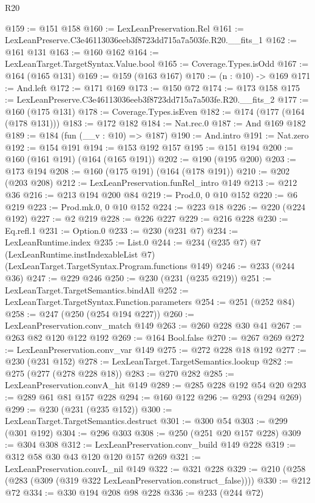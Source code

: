 \begin{lexlean}{R20}
\begin{coremodule}
@159 := @151 @158
@160 := LexLeanPreservation.Rel
@161 := LexLeanPreserve.C3e46113036eeb3f8723dd715a7a503fe.R20.__fits_1
@162 := @161 @131
@163 := @160 @162
@164 := LexLeanTarget.TargetSyntax.Value.bool
@165 := Coverage.Types.isOdd
@167 := @164 (@165 @131)
@169 := @159 (@163 @167)
@170 := (n : @10) -> @169
@171 := And.left
@172 := @171 @169
@173 := @150 @72
@174 := @173 @158
@175 := LexLeanPreserve.C3e46113036eeb3f8723dd715a7a503fe.R20.__fits_2
@177 := @160 (@175 @131)
@178 := Coverage.Types.isEven
@182 := @174 (@177 (@164 (@178 @131)))
@183 := @172 @182
@184 := Nat.rec.{0}
@187 := And @169 @182
@189 := @184 (fun (__v : @10) => @187)
@190 := And.intro
@191 := Nat.zero
@192 := @154 @191
@194 := @153 @192 @157
@195 := @151 @194
@200 := @160 (@161 @191) (@164 (@165 @191))
@202 := @190 (@195 @200)
@203 := @173 @194
@208 := @160 (@175 @191) (@164 (@178 @191))
@210 := @202 (@203 @208)
@212 := LexLeanPreservation.funRel_intro @149
@213 := @212 @36
@216 := @213 @194 @200 @84
@219 := Prod.{0, 0} @10 @152
@220 := @6 @219
@223 := Prod.mk.{0, 0} @10 @152
@224 := @223 @18
@226 := @220 (@224 @192)
@227 := @2 @219
@228 := @226 @227
@229 := @216 @228
@230 := Eq.refl.{1}
@231 := Option.{0}
@233 := @230 (@231 @7)
@234 := LexLeanRuntime.index
@235 := List.{0}
@244 := @234
    (@235 @7)
    @7
    (LexLeanRuntime.instIndexableList @7)
    (LexLeanTarget.TargetSyntax.Program.functions @149)
@246 := @233 (@244 @36)
@247 := @229 @246
@250 := @230 (@231 (@235 @219))
@251 := LexLeanTarget.TargetSemantics.bindAll
@252 := LexLeanTarget.TargetSyntax.Function.parameters
@254 := @251 (@252 @84)
@258 := @247 (@250 (@254 @194 @227))
@260 := LexLeanPreservation.conv_match @149
@263 := @260 @228 @30 @41
@267 := @263 @82 @120 @122 @192
@269 := @164 Bool.false
@270 := @267 @269
@272 := LexLeanPreservation.conv_var @149
@275 := @272 @228 @18 @192
@277 := @230 (@231 @152)
@278 := LexLeanTarget.TargetSemantics.lookup
@282 := @275 (@277 (@278 @228 @18))
@283 := @270 @282
@285 := LexLeanPreservation.convA_hit @149
@289 := @285 @228 @192 @54 @20
@293 := @289 @61 @81 @157 @228
@294 := @160 @122
@296 := @293 (@294 @269)
@299 := @230 (@231 (@235 @152))
@300 := LexLeanTarget.TargetSemantics.destruct
@301 := @300 @54
@303 := @299 (@301 @192)
@304 := @296 @303
@308 := @250 (@251 @20 @157 @228)
@309 := @304 @308
@312 := LexLeanPreservation.conv_build @149 @228
@319 := @312 @58 @30 @43 @120 @120 @157 @269
@321 := LexLeanPreservation.convL_nil @149
@322 := @321 @228
@329 := @210 (@258 (@283 (@309 (@319 @322 LexLeanPreservation.construct_false))))
@330 := @212 @72
@334 := @330 @194 @208 @98 @228
@336 := @233 (@244 @72)

\end{coremodule}
\end{lexlean}
